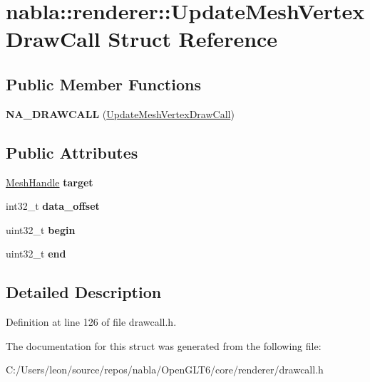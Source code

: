 \hypertarget{structnabla_1_1renderer_1_1_update_mesh_vertex_draw_call}{}\section{nabla\+::renderer\+::Update\+Mesh\+Vertex\+Draw\+Call Struct Reference}
\label{structnabla_1_1renderer_1_1_update_mesh_vertex_draw_call}
\subsection*{Public Member Functions}
\begin{DoxyCompactItemize}
\item 
\mbox{\label{structnabla_1_1renderer_1_1_update_mesh_vertex_draw_call_a85276df7c22728f20220d70f1b98c7a2}} 
{\bfseries N\+A\+\_\+\+D\+R\+A\+W\+C\+A\+LL} (\mbox{\hyperlink{structnabla_1_1renderer_1_1_update_mesh_vertex_draw_call}{Update\+Mesh\+Vertex\+Draw\+Call}})
\end{DoxyCompactItemize}
\subsection*{Public Attributes}
\begin{DoxyCompactItemize}
\item 
\mbox{\label{structnabla_1_1renderer_1_1_update_mesh_vertex_draw_call_adc138ac55c72e44cf6716acf09fa5b08}} 
\mbox{\hyperlink{classnabla_1_1renderer_1_1_handle}{Mesh\+Handle}} {\bfseries target}
\item 
\mbox{\label{structnabla_1_1renderer_1_1_update_mesh_vertex_draw_call_af7c95b4e85f0f17bd97e59ace1bdf120}} 
int32\+\_\+t {\bfseries data\+\_\+offset}
\item 
\mbox{\label{structnabla_1_1renderer_1_1_update_mesh_vertex_draw_call_a4ae6f429611071045a128745f69ac7d9}} 
uint32\+\_\+t {\bfseries begin}
\item 
\mbox{\label{structnabla_1_1renderer_1_1_update_mesh_vertex_draw_call_a41b629c5d901d4279868c52180858658}} 
uint32\+\_\+t {\bfseries end}
\end{DoxyCompactItemize}


\subsection{Detailed Description}


Definition at line 126 of file drawcall.\+h.



The documentation for this struct was generated from the following file\+:\begin{DoxyCompactItemize}
\item 
C\+:/\+Users/leon/source/repos/nabla/\+Open\+G\+L\+T6/core/renderer/drawcall.\+h\end{DoxyCompactItemize}
